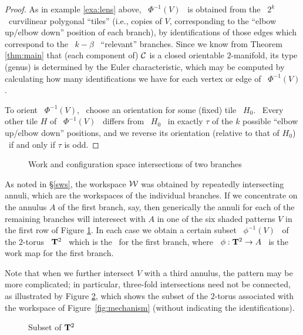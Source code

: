 \begin{proof}
%
As in example \ref{exa:lens} above, \ $\Phi^{-1}(V)$ \ is obtained
from the \ $2^{k}$ \ curvilinear polygonal ``tiles'' (i.e., copies
of $V$, corresponding to the ``elbow up/elbow down'' position of
each branch), by identifications of those edges which correspond
to the \ $k-\beta$ \ ``relevant'' branches. Since we know from
Theorem \ref{thm:main} that (each component of) $\mathcal{C}$ is a closed
orientable $2$-manifold, its type (genus) is determined by the
Euler characteristic, which may be computed by calculating how
many identifications we have for each vertex or edge of  \
$\Phi^{-1}(V)$.

To orient \ $\Phi^{-1}(V)$, \ choose an orientation for some
(fixed) tile \ $H_{0}$. \ Every other tile $H$ of \ $\Phi^{-1}(V)$
\ differs from \ $H_{0}$ \ in exactly $\tau$ of the $k$ possible
``elbow up/elbow down'' positions, and we reverse its orientation
(relative to that of $H_{0}$) \ if and only if $\tau$ is odd.
%
\end{proof}

\begin{figure}[htbp]
\begin{center}
\epsfysize=3cm %
\leavevmode {}  \caption{Work and
configuration space intersections of two
branches}\label{fig:embeddings}
\end{center}
\end{figure}

\begin{remark}
\label{rem:conntor}

As noted in \S \ref{sws}, the workspace $\mathcal{W}$ was obtained by
repeatedly intersecting annuli, which are the workspaces of the
individual branches. If we concentrate on the annulus $A$ of the
first branch, say, then generically the annuli for each of the
remaining branches will interesect with $A$ in one of the six
shaded patterns $V$ in the first row of Figure
\ref{fig:embeddings}. In each case we obtain a certain subset \
$\phi^{-1}(V)$ \ of the $2$-torus \ ${\mathbf{T}^{2}}$ \ which is the
\cspace\ for the first branch, where \ $\phi:{\mathbf{T}^{2}}\to A$ \ is the
work map for the first branch.

Note that when we further intersect $V$ with a third annulus, the
pattern may be more complicated; in particular, three-fold
intersections need not be connected, as illustrated by Figure
\ref{fig:punctured_torus}, which shows the subset of the $2$-torus
associated with the workspace of Figure~\ref{fig:mechanism}
(without indicating the identifications).

\begin{figure}[h] \epsfysize=3cm%
\begin{center}
\leavevmode \epsffile{fig_1/punctured_torus.eps}   \caption{Subset
of ${\mathbf{T}^{2}}$}\label{fig:punctured_torus}
\end{center}
\end{figure}
\end{remark}

